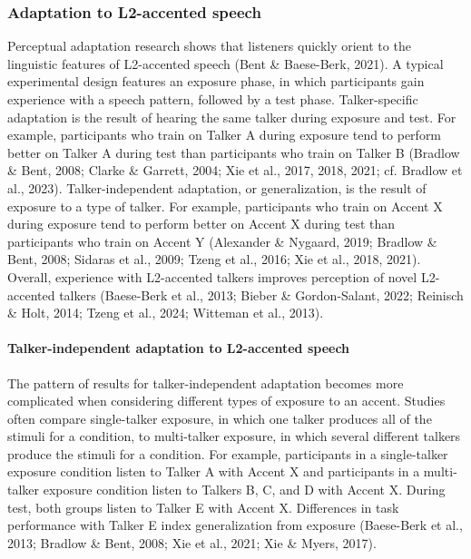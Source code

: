 \documentclass[
  12pt,
  twoside]{article}
\begin{document}
\hypertarget{adaptation-to-l2-accented-speech}{%
\subsubsection{Adaptation to L2-accented speech}\label{adaptation-to-l2-accented-speech}}

Perceptual adaptation research shows that listeners quickly orient to the linguistic features of L2-accented speech (Bent \& Baese-Berk, 2021).
A typical experimental design features an exposure phase, in which participants gain experience with a speech pattern, followed by a test phase.
Talker-specific adaptation is the result of hearing the same talker during exposure and test.
For example, participants who train on Talker A during exposure tend to perform better on Talker A during test than participants who train on Talker B (Bradlow \& Bent, 2008; Clarke \& Garrett, 2004; Xie et al., 2017, 2018, 2021; cf. Bradlow et al., 2023).
Talker-independent adaptation, or generalization, is the result of exposure to a type of talker.
For example, participants who train on Accent X during exposure tend to perform better on Accent X during test than participants who train on Accent Y (Alexander \& Nygaard, 2019; Bradlow \& Bent, 2008; Sidaras et al., 2009; Tzeng et al., 2016; Xie et al., 2018, 2021).
Overall, experience with L2-accented talkers improves perception of novel L2-accented talkers (Baese-Berk et al., 2013; Bieber \& Gordon-Salant, 2022; Reinisch \& Holt, 2014; Tzeng et al., 2024; Witteman et al., 2013).

\hypertarget{talker-independent-adaptation-to-l2-accented-speech}{%
\paragraph{Talker-independent adaptation to L2-accented speech}\label{talker-independent-adaptation-to-l2-accented-speech}}

The pattern of results for talker-independent adaptation becomes more complicated when considering different types of exposure to an accent.
Studies often compare single-talker exposure, in which one talker produces all of the stimuli for a condition, to multi-talker exposure, in which several different talkers produce the stimuli for a condition.
For example, participants in a single-talker exposure condition listen to Talker A with Accent X and participants in a multi-talker exposure condition listen to Talkers B, C, and D with Accent X.
During test, both groups listen to Talker E with Accent X.
Differences in task performance with Talker E index generalization from exposure (Baese-Berk et al., 2013; Bradlow \& Bent, 2008; Xie et al., 2021; Xie \& Myers, 2017).
\end{document}

